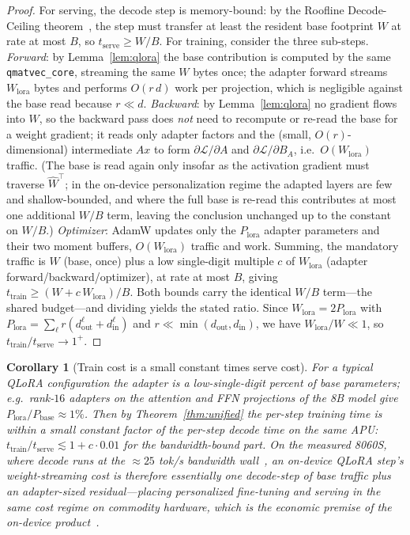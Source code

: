 \documentclass[11pt]{article}
\newtheorem{corollary}{Corollary}
\begin{document}
\begin{proof}
For serving, the decode step is memory-bound: by the Roofline Decode-Ceiling theorem~\cite{hanzo-rocm,williams2009}, the step must transfer at least the resident base footprint $W$ at rate at most $B$, so $t_{\text{serve}}\geq W/B$. For training, consider the three sub-steps. \emph{Forward}: by Lemma~\ref{lem:qlora} the base contribution is computed by the same \texttt{qmatvec\_core}, streaming the same $W$ bytes once; the adapter forward streams $W_{\text{lora}}$ bytes and performs $O(r\,d)$ work per projection, which is negligible against the base read because $r\ll d$. \emph{Backward}: by Lemma~\ref{lem:qlora} no gradient flows into $W$, so the backward pass does \emph{not} need to recompute or re-read the base for a weight gradient; it reads only adapter factors and the (small, $O(r)$-dimensional) intermediate $Ax$ to form $\partial\mathcal{L}/\partial A$ and $\partial\mathcal{L}/\partial B_{\!A}$, i.e.\ $O(W_{\text{lora}})$ traffic. (The base is read again only insofar as the activation gradient must traverse $\hat W^{\!\top}$; in the on-device personalization regime the adapted layers are few and shallow-bounded, and where the full base is re-read this contributes at most one additional $W/B$ term, leaving the conclusion unchanged up to the constant on $W/B$.) \emph{Optimizer}: AdamW updates only the $P_{\text{lora}}$ adapter parameters and their two moment buffers, $O(W_{\text{lora}})$ traffic and work. Summing, the mandatory traffic is $W$ (base, once) plus a low single-digit multiple $c$ of $W_{\text{lora}}$ (adapter forward/backward/optimizer), at rate at most $B$, giving $t_{\text{train}}\geq (W + c\,W_{\text{lora}})/B$. Both bounds carry the identical $W/B$ term---the shared budget---and dividing yields the stated ratio. Since $W_{\text{lora}}=2P_{\text{lora}}$ with $P_{\text{lora}}=\sum_\ell r(d^\ell_{\text{out}}+d^\ell_{\text{in}})$ and $r\ll\min(d_{\text{out}},d_{\text{in}})$, we have $W_{\text{lora}}/W\ll 1$, so $t_{\text{train}}/t_{\text{serve}}\to 1^+$.
\end{proof}

\begin{corollary}[Train cost is a small constant times serve cost]
\label{cor:budget}
For a typical QLoRA configuration the adapter is a low-single-digit percent of base parameters; e.g.\ rank-$16$ adapters on the attention and FFN projections of the 8B model give $P_{\text{lora}}/P_{\text{base}}\approx 1\%$. Then by Theorem~\ref{thm:unified} the per-step training time is within a small constant factor of the per-step decode time on the same APU: $t_{\text{train}}/t_{\text{serve}} \lesssim 1 + c\cdot 0.01$ for the bandwidth-bound part. On the measured 8060S, where decode runs at the $\approx 25$ tok/s bandwidth wall~\cite{hanzo-rocm}, an on-device QLoRA step's weight-streaming cost is therefore essentially one decode-step of base traffic plus an adapter-sized residual---placing personalized fine-tuning and serving in the \emph{same} cost regime on commodity hardware, which is the economic premise of the on-device product~\cite{hanzo-clp,hanzo-platform}.
\end{corollary}
\end{document}
